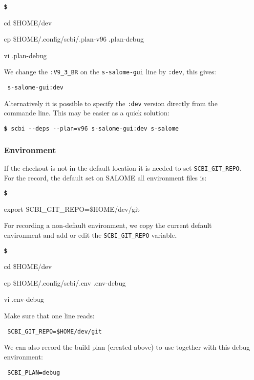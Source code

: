 \documentclass[a4paper,12pt,twoside]{article}
\newenvironment{shellcommand}{
	\begin{list}{ %
			\bfseries\texttt \$
		}{ %
			\ttfamily
			\setlength{\topsep}{-0.3ex}
			\setlength{\labelwidth}{1in}
			\setlength{\leftmargin}{0.7in}
			\setlength{\labelsep}{0.5ex}
			\setlength{\rightmargin}{0.5in}
			\setlength{\itemsep}{1ex}
			\setlength{\parsep}{0ex}
			\setlength{\listparindent}{0.5in}
		}
	}{
	\end{list}
}
\newcommand{\code}[1]{\texttt{#1}}
\newcommand{\cmd}[1]{\tabto{1cm}\hspace{0.5cm}\texttt{\textbf{\$} #1}}
\newcommand{\ddash}{-{}-}
\begin{document}
\begin{shellcommand}
	\item cd \$HOME/dev
	\item cp \$HOME/.config/scbi/.plan-v96 .plan-debug
	\item vi .plan-debug
\end{shellcommand}

We change the \code{:V9\_3\_BR} on the \code{s-salome-gui} line by \code{:dev}, this gives:

\begin{lstlisting}
 s-salome-gui:dev
\end{lstlisting}

Alternatively it is possible to specify the \code{:dev} version directly from the commande line. This may be easier as a quick solution:

\cmd{scbi \ddash{}deps \ddash{}plan=v96 s-salome-gui:dev s-salome}

\subsubsection{Environment}

If the checkout is not in the default location it is needed to set \code{SCBI\_GIT\_REPO}. For the record, the default set on SALOME all environment files is:

\begin{shellcommand}
	\item export SCBI\_GIT\_REPO=\$HOME/dev/git
\end{shellcommand}

For recording a non-default environment, we copy the current default environment and add or edit the \code{SCBI\_GIT\_REPO} variable.

\begin{shellcommand}
	\item cd \$HOME/dev
	\item cp \$HOME/.config/scbi/.env .env-debug
	\item vi .env-debug
\end{shellcommand}

Make sure that one line reads:

\begin{lstlisting}
 SCBI_GIT_REPO=$HOME/dev/git
\end{lstlisting}

We can also record the build plan (created above) to use together with this debug environment:

\begin{lstlisting}
 SCBI_PLAN=debug
\end{lstlisting}
\end{document}

